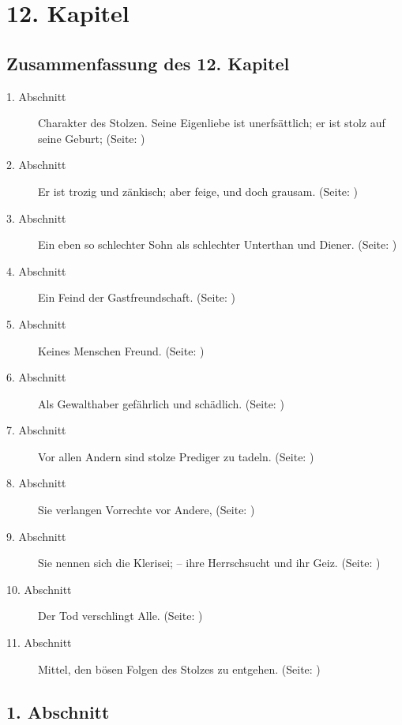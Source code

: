 

\chapter{12. Kapitel} \label{kap12}

\section{Zusammenfassung des 12. Kapitel}
\footnotesize
\begin{description}
\item[1. Abschnitt] Charakter des Stolzen. Seine Eigenliebe ist unerfsättlich;
er
ist stolz auf seine Geburt; (Seite: \pageref{kap12_ab1})
\item[2. Abschnitt] Er ist trozig und zänkisch; aber feige, und doch grausam.
(Seite: \pageref{kap12_ab2})
\item[3. Abschnitt] Ein eben so schlechter Sohn als schlechter Unterthan und
Diener. (Seite: \pageref{kap12_ab3})
\item[4. Abschnitt] Ein Feind der Gastfreundschaft. (Seite: \pageref{kap12_ab4})
\item[5. Abschnitt] Keines Menschen Freund. (Seite: \pageref{kap12_ab5})
\item[6. Abschnitt] Als Gewalthaber gefährlich und schädlich. (Seite:
\pageref{kap12_ab6})
\item[7. Abschnitt] Vor allen Andern sind stolze Prediger zu tadeln. (Seite:
\pageref{kap12_ab7})
\item[8. Abschnitt] Sie verlangen Vorrechte vor Andere, (Seite:
\pageref{kap12_ab8})
\item[9. Abschnitt] Sie nennen sich die Klerisei; -- ihre Herrschsucht und ihr
Geiz. (Seite: \pageref{kap12_ab9})
\item[10. Abschnitt] Der Tod verschlingt Alle. (Seite: \pageref{kap12_ab10})
\item[11. Abschnitt] Mittel, den bösen Folgen des Stolzes zu entgehen. (Seite:
\pageref{kap12_ab11})
\end{description}
\normalsize

\section{1. Abschnitt} \label{kap12_ab1}

